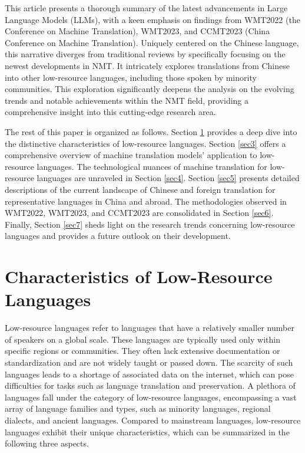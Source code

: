 \documentclass[acmsmall]{acmart}
\begin{document}
\color{red}

This article presents a thorough summary of the latest advancements in Large Language Models (LLMs), with a keen emphasis on findings from WMT2022 (the Conference on Machine Translation), WMT2023, and CCMT2023 (China Conference on Machine Translation). Uniquely centered on the Chinese language, this narrative diverges from traditional reviews by specifically focusing on the newest developments in NMT. It intricately explores translations from Chinese into other low-resource languages, including those spoken by minority communities. This exploration significantly deepens the analysis on the evolving trends and notable achievements within the NMT field, providing a comprehensive insight into this cutting-edge research area.

\color{black}
The rest of this paper is organized as follows. Section \ref{sec2} provides a deep dive into the distinctive characteristics of low-resource languages. Section \ref{sec3} offers a comprehensive overview of machine translation models' application to low-resource languages. The technological nuances of machine translation for low-resource languages are unraveled in Section \ref{sec4}. Section \ref{sec5} presents detailed descriptions of the current landscape of Chinese and foreign translation for representative languages in China and abroad. The methodologies observed in WMT2022, WMT2023, and CCMT2023 are consolidated in Section \ref{sec6}. Finally, Section \ref{sec7} sheds light on the research trends concerning low-resource languages and provides a future outlook on their development. 


\section{Characteristics of Low-Resource Languages}
\label{sec2}
Low-resource languages refer to languages that have a relatively smaller number of speakers on a global scale. These languages are typically used only within specific regions or communities. They often lack extensive documentation or standardization and are not widely taught or passed down. The scarcity of such languages leads to a shortage of associated data on the internet, which can pose difficulties for tasks such as language translation and preservation. A plethora of languages fall under the category of low-resource languages, encompassing a vast array of language families and types, such as minority languages, regional dialects, and ancient languages. Compared to mainstream languages, low-resource languages exhibit their unique characteristics, which can be summarized in the following three aspects.
\end{document}
